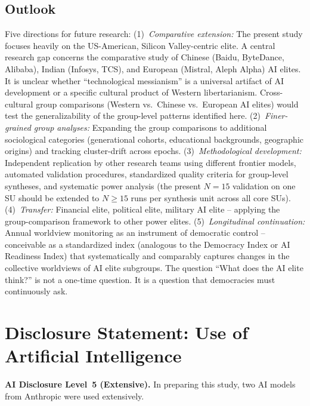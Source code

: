 \documentclass[12pt,a4paper]{article}
\begin{document}
\subsection{Outlook}

Five directions for future research: (1)~\emph{Comparative extension:} The present study focuses heavily on the US-American, Silicon Valley-centric elite. A central research gap concerns the comparative study of Chinese (Baidu, ByteDance, Alibaba), Indian (Infosys, TCS), and European (Mistral, Aleph Alpha) AI elites. It is unclear whether ``technological messianism'' is a universal artifact of AI development or a specific cultural product of Western libertarianism. Cross-cultural group comparisons (Western vs.\ Chinese vs.\ European AI elites) would test the generalizability of the group-level patterns identified here. (2)~\emph{Finer-grained group analyses:} Expanding the group comparisons to additional sociological categories (generational cohorts, educational backgrounds, geographic origins) and tracking cluster-drift across epochs. (3)~\emph{Methodological development:} Independent replication by other research teams using different frontier models, automated validation procedures, standardized quality criteria for group-level syntheses, and systematic power analysis (the present $N = 15$ validation on one SU should be extended to $N \geq 15$ runs per synthesis unit across all core SUs). (4)~\emph{Transfer:} Financial elite, political elite, military AI elite -- applying the group-comparison framework to other power elites. (5)~\emph{Longitudinal continuation:} Annual worldview monitoring as an instrument of democratic control -- conceivable as a standardized index (analogous to the Democracy Index or AI Readiness Index) that systematically and comparably captures changes in the collective worldviews of AI elite subgroups. The question ``What does the AI elite think?'' is not a one-time question. It is a question that democracies must continuously ask.


\section*{Disclosure Statement: Use of Artificial Intelligence}

\noindent\textbf{AI Disclosure Level~5 (Extensive).}
In preparing this study, two AI models from Anthropic were used extensively.
\end{document}
